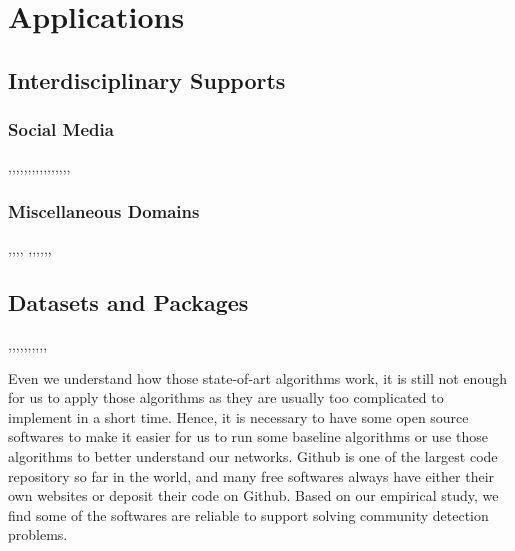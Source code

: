 \section{Applications}
\subsection{Interdisciplinary Supports}
\subsubsection{Social Media}
\cite{papadopoulos2012community},\cite{latouche2011overlapping},\cite{xie2014community},\cite{kumar2017army},\cite{cheng2014community},\cite{danescu2013no},\cite{leskovec2012learning},\cite{kairam2012life},\cite{gargi2011large},\cite{sachan2012using},\cite{wang2010community},\cite{traud2011comparing},\cite{botta2017analysis},\cite{ozer2016community},\cite{natarajan2013community},\cite{zhao2012topic},



\subsubsection{Miscellaneous Domains}
\cite{garcia2018applications},\cite{liu2014network},\cite{nepusz2012detecting},\cite{lewis2010function},\cite{bassett2015extraction} ,\cite{gupta2011evolutionary},\cite{chakraborty2013overcite},\cite{coca2016musical},\cite{fang2016community},\cite{hu2016co},


\subsection{Datasets  and Packages}
\cite{leskovec2015snap} 
\cite{smoot2010cytoscape},\cite{de2015muxviz},\cite{hagberg2013networkx},\cite{csardi2006igraph},\cite{de2018exploratory},\cite{ghim2014netminer},\cite{adamcsek2006cfinder},\cite{bastian2009gephi},\cite{borgatti2014ucinet},\cite{carley2014ora}, 


Even we understand how those state-of-art algorithms work, it is still not enough for us to apply those algorithms as they are usually too complicated to implement in a short time. Hence, it is necessary to have some open source softwares to make it easier for us to run some baseline algorithms or use those algorithms to better understand our networks. Github is one of the largest code repository so far in the world, and many free softwares always have either their own websites or deposit their code on Github. Based on our empirical study, we find some of the softwares are reliable to support solving community detection problems.

